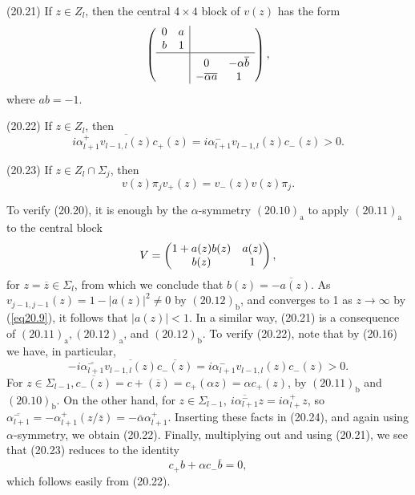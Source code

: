 \documentclass{surv-l}
\theoremstyle{plain}
\theoremstyle{definition}
\numberwithin{equation}{chapter}
\begin{document}
(20.21) If $z\in Z_{l}$, then the central $4\times 4$ block of $v(z)$ has the form
\begin{align*}
\left(\begin{array}{@{}c@{}|@{}c@{}}
\begin{array}{cc}
   0 & a \\
   b & 1
\end{array} &  \\
\hline
 & \begin{array}{cc}
 & \\[-9pt]
0 & -\alpha\overline{b} \\
-\overline{\alpha}\overline{a} & 1
\end{array} \\
\end{array}\right),
\end{align*}
where $ab=-1$.
\renewcommand\theequation{\arabic{equation}}

(20.22) If $z\in Z_{l}$, then
\begin{equation*}
i\alpha_{l+1}^{+}\overline{v_{l-1,l}(z)}c_{+}(z)=i\alpha_{l+1}^{-}v_{l-1,l}(z)c_{-}(z)>0.
\end{equation*}

(20.23) If $z\in Z_{l}\cap\Sigma_{j}$, then
\begin{equation*}
v(z)\pi_{j}v_{+}(z)=v_{-}(z)v(z)\pi_{j}.
\end{equation*}

To verify (20.20), it is enough by the $\alpha$-symmetry $\mathrm{(20.10)_{a}}$ to apply $\mathrm{(20.11)_{a}}$ to the central block
\begin{equation*}
V=\left(\begin{array}{@{}cc@{}}
1+a(z)b(z) & a(z)\\
  b(z) & 1
\end{array}\right),
\end{equation*}
for $z=\overline{z}\in\Sigma_{l}$, from which we conclude that $b(z)=\overline{-a(z)}$. As $v_{j-1,j-1}(z)= 1-|a(z)|^{2}\neq 0$ by $\mathrm{(20.12)_{b}}$, and converges to 1 as $ z\rightarrow\infty$ by (\ref{eq20.9}), it follows that $|a(z)|<1$. In a similar way, (20.21) is a consequence of $\mathrm{(20.11)_{a},(20.12)_{a}}$, and $\mathrm{(20.12)_{b}}$. To verify (20.22), note that by (20.16) we have, in particular,
\begin{equation*}
-i\overline{\alpha_{l+1}^{-}}\overline{v_{l-1,l}(z)}\overline{c_{-}(z)}=i\alpha_{l+1}^{-}v_{l-1,l}(z)c_{-}(z)>0.
\end{equation*}
For $z\in\Sigma_{l-1},\overline{c_{-}(z)}=c+(\overline{z})=c_{+}(\alpha z)=\alpha c_{+}(z)$, by $\mathrm{(20.11)_{b}}$ and $\mathrm{(20.10)_{b}}$. On the other hand, for $z\in\Sigma_{l-1},\ \overline{i\alpha_{l+1}^{-}}z=i\alpha_{l+}^{+}z$, so $\overline{\alpha_{l+1}^{-}}=-\alpha_{l+1}^{+}(z/\overline{z})=-\overline{\alpha}\alpha_{l+1}^{+}$. Inserting these facts in (20.24), and again using $\alpha$-symmetry, we obtain (20.22). Finally, multiplying out and using (20.21), we see that (20.23) reduces to the identity
\begin{equation*}
c_{+}b+\alpha c_{-}\overline{b}=0,
\end{equation*}
which follows easily from (20.22).
\end{document}
